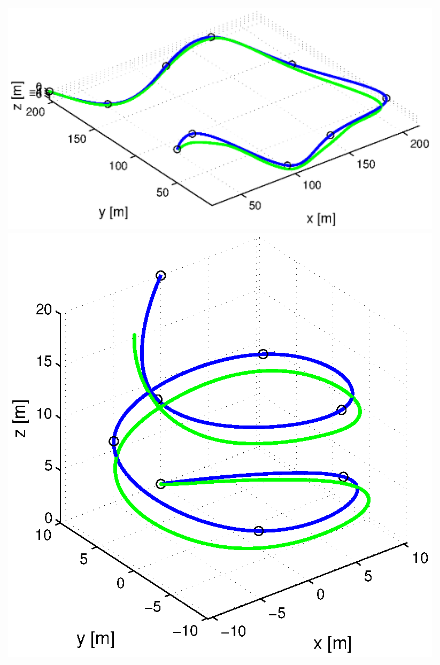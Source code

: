 \begin{figure}[H]
  \begin{minipage}[t]{0.32\textwidth}
    \includegraphics[width = \textwidth]{trackings_wc/figure_3D_road_SplineDegree3_trajectoryFollowing_Disturbance_0}
  \end{minipage}
  \hfill
  \begin{minipage}[t]{0.32\textwidth}
    \includegraphics[width = \textwidth]{trackings_wc/figure_3D_helix_SplineDegree3_trajectoryFollowing_Disturbance_0}
  \end{minipage}
  \hfill
  \begin{minipage}[t]{0.32\textwidth}

\end{minipage}
\end{figure}
